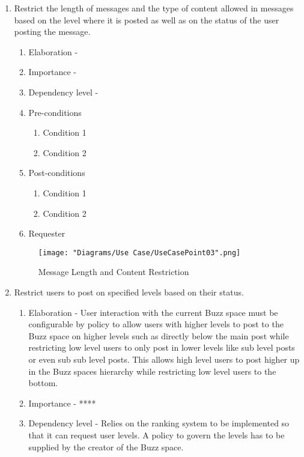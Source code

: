 \documentclass[12pt]{article}
\begin{document}
\begin{enumerate}
\newpage %
  \item Restrict the length of messages and the type of content allowed in messages based
on the level where it is posted as well as on the status of the user posting the
message.  %
  \begin{enumerate}
    \item Elaboration - 
    \item Importance - 
    \item Dependency level - 
    \item Pre-conditions
    \begin{enumerate}
    	\item Condition 1
    	\item Condition 2
    \end{enumerate}
        \item Post-conditions
    \begin{enumerate}
    	\item Condition 1
    	\item Condition 2
    \end{enumerate}
    \item Requester
  \end{enumerate}
\begin{figure}[h]
  	\centering
  	\texttt{[image: "Diagrams/Use Case/UseCasePoint03".png]}
  	\caption{Message Length and Content Restriction}
  \end{figure}
\newpage %
   \item Restrict users to post on specified levels based on their status. %
  \begin{enumerate}
    \item Elaboration - User interaction with the current Buzz space must be configurable by policy to allow users with higher levels to post to the Buzz space on higher levels such as directly below the main post while restricting low level users to only post in lower levels like sub level posts or even sub sub level posts. This allows high level users to post higher up in the Buzz spaces hierarchy while restricting low level users to the bottom. 
    \item Importance - ****
    \item Dependency level - Relies on the ranking system to be implemented so that it can request user levels. A policy to govern the levels has to be supplied by the creator of the Buzz space.

\end{enumerate}
\end{enumerate}
\end{document}

